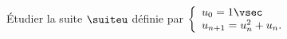\begin{exercice}
\'Etudier la suite $\suiteu$ d\'efinie par 
$\left\lbrace\begin{array}{l}
u_0=1\vsec\\
u_{n+1}=u_n^2+u_n.
\end{array}\right.$
\end{exercice}
